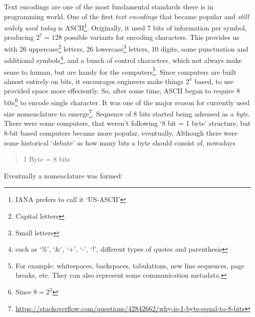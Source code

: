 \documentclass[../../what-is-computer.tex]{subfiles}
\begin{document}
    Text encodings are one of the most fundamental standards there is in programming world. One of the first \emph{text encodings} that became popular and \emph{still widely
    used today} is ASCII\footnote{IANA prefers to call it `US-ASCII'}. Originally, it used 7 bits of information per symbol, producing $2^7 = 128$ possible 
    variants for encoding characters. This provides us with 26 uppercase\footnote{Capital letters} letters, 26 lowercase\footnote{Small letters} letters, 10 digits, some punctuation
    and additional symbols\footnote{such as `\%', `\&', `+', `-', `!', different types of quotes and parenthesis}, and a bunch of control characters, which not always make sense to human,
    but are handy for the computers\footnote{For example: whitespaces, backspaces, tabulations, new line sequences, page breaks, etc. They can also represent some communication metadata.}.
    Since computers are built almost entirely on bits, it encourages engineers make things $2^x$ based, to use provided space more effeciently. So, after some time, ASCII
    began to require 8 bits\footnote{Since $8 = 2^3$} to encode single character. It was one of the major reason for currently used size nomenclature to 
    emerge\footnote{\href{https://stackoverflow.com/questions/42842662/why-is-1-byte-equal-to-8-bits}{https://stackoverflow.com/questions/42842662/why-is-1-byte-equal-to-8-bits}}.
    Sequence of 8 bits started being adressed as a \emph{byte}. There were some computers, that weren't following `8 bit = 1 byte' structure, but 8-bit based
    computers became more popular, eventually. Although there were some historical `debate' as how many bits a byte should consist of, nowadays 

    \begin{quote}
        \begin{center}
            1 Byte = 8 bits                                    
        \end{center}
    \end{quote}

    Eventually a nomenclature was formed: 
\end{document}
